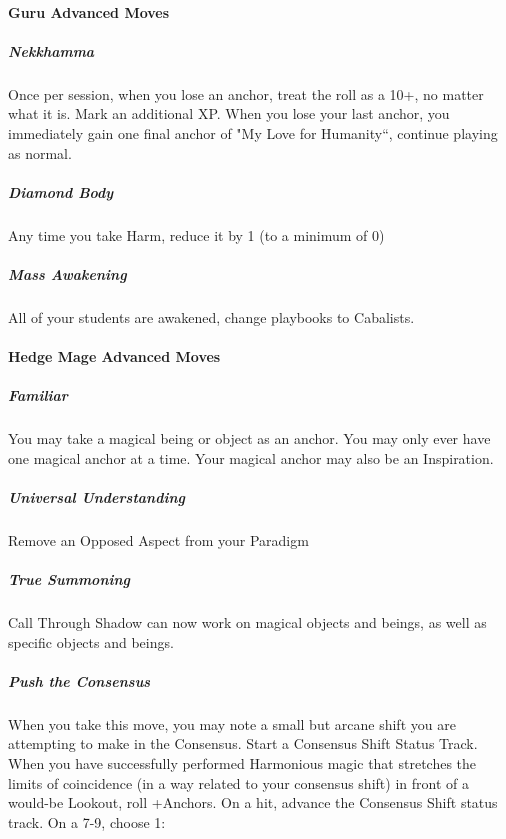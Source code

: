 \documentclass[
]{article}
\begin{document}
\hypertarget{guru-advanced-moves}{%
\paragraph{Guru Advanced Moves}\label{guru-advanced-moves}}

\hypertarget{nekkhamma}{%
\subparagraph{Nekkhamma}\label{nekkhamma}}

Once per session, when you lose an anchor, treat the roll as a 10+, no
matter what it is. Mark an additional XP. When you lose your last
anchor, you immediately gain one final anchor of "My Love for
Humanity``, continue playing as normal.

\hypertarget{diamond-body}{%
\subparagraph{Diamond Body}\label{diamond-body}}

Any time you take Harm, reduce it by 1 (to a minimum of 0)

\hypertarget{mass-awakening}{%
\subparagraph{Mass Awakening}\label{mass-awakening}}

All of your students are awakened, change playbooks to Cabalists.

\hypertarget{hedge-mage-advanced-moves}{%
\paragraph{Hedge Mage Advanced Moves}\label{hedge-mage-advanced-moves}}

\hypertarget{familiar}{%
\subparagraph{Familiar}\label{familiar}}

You may take a magical being or object as an anchor. You may only ever
have one magical anchor at a time. Your magical anchor may also be an
Inspiration.

\hypertarget{universal-understanding}{%
\subparagraph{Universal Understanding}\label{universal-understanding}}

Remove an Opposed Aspect from your Paradigm

\hypertarget{true-summoning}{%
\subparagraph{True Summoning}\label{true-summoning}}

Call Through Shadow can now work on magical objects and beings, as well
as specific objects and beings.

\hypertarget{push-the-consensus}{%
\subparagraph{Push the Consensus}\label{push-the-consensus}}

When you take this move, you may note a small but arcane shift you are
attempting to make in the Consensus. Start a Consensus Shift Status
Track. When you have successfully performed Harmonious magic that
stretches the limits of coincidence (in a way related to your consensus
shift) in front of a would-be Lookout, roll +Anchors. On a hit, advance
the Consensus Shift status track. On a 7-9, choose 1:
\end{document}

